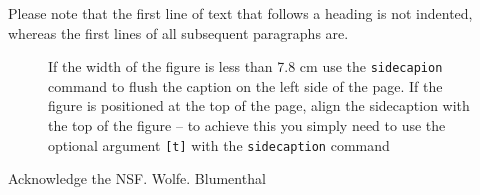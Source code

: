 \documentclass[graybox]{svmult}
\begin{document}
Please note that the first line of text that follows a heading is not indented, whereas the first lines of all subsequent paragraphs are.

%
\begin{figure}[b]
\sidecaption
%
%
\caption{If the width of the figure is less than 7.8 cm use the \texttt{sidecapion} command to flush the caption on the left side of the page. If the figure is positioned at the top of the page, align the sidecaption with the top of the figure -- to achieve this you simply need to use the optional argument \texttt{[t]} with the \texttt{sidecaption} command}
\label{fig:1}       %
\end{figure}


%
\begin{acknowledgement}
Acknowledge the NSF.  Wolfe.  Blumenthal
\end{acknowledgement}
%
%
%

%
% 
% 
\end{document}
